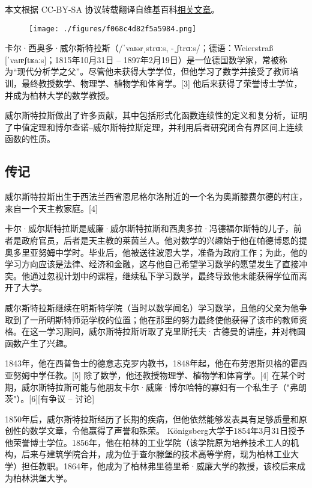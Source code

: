 
本文根据 CC-BY-SA 协议转载翻译自维基百科\href{https://en.wikipedia.org/wiki/Karl_Weierstrass}{相关文章}。

\begin{figure}[ht]
\centering
\texttt{[image: ./figures/f068c4d82f5a5984.png]}
\caption{} \label{fig_Karl_1}
\end{figure}
卡尔·西奥多·威尔斯特拉斯（/ˈvaɪərˌstrɑːs, -ˌʃtrɑːs/；德语：Weierstraß [ˈvaɪɐʃtʁaːs]；1815年10月31日 – 1897年2月19日）是一位德国数学家，常被称为“现代分析学之父”。尽管他未获得大学学位，但他学习了数学并接受了教师培训，最终教授数学、物理学、植物学和体育学。[3] 他后来获得了荣誉博士学位，并成为柏林大学的数学教授。

威尔斯特拉斯做出了许多贡献，其中包括形式化函数连续性的定义和复分析，证明了中值定理和博尔查诺–威尔斯特拉斯定理，并利用后者研究闭合有界区间上连续函数的性质。
\subsection{传记}
威尔斯特拉斯出生于西法兰西省恩尼格尔洛附近的一个名为奥斯滕费尔德的村庄，来自一个天主教家庭。[4]

卡尔·威尔斯特拉斯是威廉·威尔斯特拉斯和西奥多拉·冯德福尔斯特的儿子，前者是政府官员，后者是天主教的莱茵兰人。他对数学的兴趣始于他在帕德博恩的提奥多里亚努姆中学时。毕业后，他被送往波恩大学，准备为政府工作；为此，他的学习方向应该是法律、经济和金融，这与他自己希望学习数学的愿望发生了直接冲突。他通过忽视计划中的课程，继续私下学习数学，最终导致他未能获得学位而离开了大学。

威尔斯特拉斯继续在明斯特学院（当时以数学闻名）学习数学，且他的父亲为他争取到了一所明斯特师范学校的位置；他在那里的努力最终使他获得了该市的教师资格。在这一学习期间，威尔斯特拉斯听取了克里斯托夫·古德曼的讲座，并对椭圆函数产生了兴趣。

1843年，他在西普鲁士的德意志克罗内教书，1848年起，他在布劳恩斯贝格的霍西亚努姆中学任教。[5] 除了数学，他还教授物理学、植物学和体育学。[4] 在某个时期，威尔斯特拉斯可能与他朋友卡尔·威廉·博尔哈特的寡妇有一个私生子（"弗朗茨"）。[6][有争议 – 讨论]

1850年后，威尔斯特拉斯经历了长期的疾病，但他依然能够发表具有足够质量和原创性的数学文章，令他赢得了声誉和殊荣。 Königsberg大学于1854年3月31日授予他荣誉博士学位。1856年，他在柏林的工业学院（该学院原为培养技术工人的机构，后来与建筑学院合并，成为位于查尔滕堡的技术高等学府，现为柏林工业大学）担任教职。1864年，他成为了柏林弗里德里希·威廉大学的教授，该校后来成为柏林洪堡大学。

